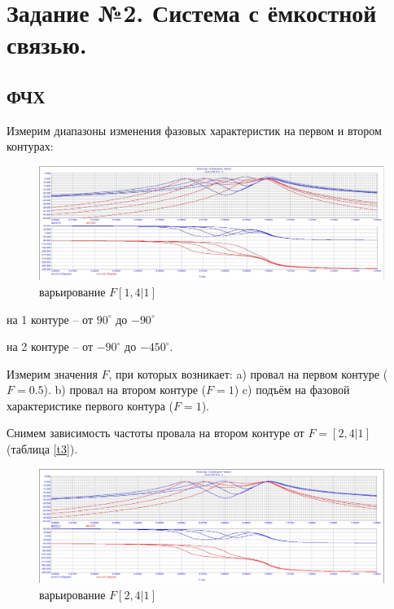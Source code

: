 \documentclass[a4paper, 14pt]{extarticle}%
\begin{document}
\newpage

\section{Задание №2. Система с ёмкостной связью.}

\subsection{ФЧХ}

Измерим диапазоны изменения фазовых характеристик на первом и втором контурах:

\begin{figure}[h!]
	\centering
			\includegraphics[width=1.1\linewidth]{2.1_varF1.jpg}
            \caption{варьирование $F  [1, 4|1]$}
	\label{A}
\end{figure}


на 1 контуре -- от $90^{\circ}$ до $-90^{\circ}$

на 2 контуре -- от $-90^{\circ}$ до $-450^{\circ}$.

Измерим значения $F$, при которых возникает:
\newline
a) провал на первом контуре ($F = 0.5$).
\newline
b) провал на втором контуре ($F = 1$) c) подъём на фазовой характеристике первого контура ($F = 1$).

Снимем зависимость частоты провала на втором контуре от $F = [2, 4|1]$ (таблица \ref{t3}).

\begin{figure}[h!]
	\centering
			\includegraphics[width=1.1\linewidth]{2.1_varF2.jpg}
            \caption{варьирование $F  [2, 4|1]$}
	\label{A}
\end{figure}
\end{document}
